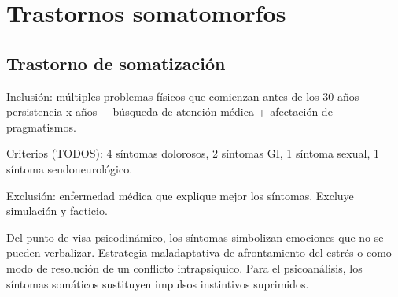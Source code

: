 \chapter{Trastornos somatomorfos}
\section*{Trastorno de somatización}
Inclusión: múltiples problemas físicos que comienzan antes de los 30 años + persistencia x años + búsqueda de atención médica + afectación de pragmatismos.

Criterios (TODOS): 4 síntomas dolorosos, 2 síntomas GI, 1 síntoma sexual, 1 síntoma seudoneurológico.

Exclusión: enfermedad médica que explique mejor los síntomas. Excluye simulación y facticio.

Del punto de visa psicodinámico, los síntomas simbolizan emociones que no se pueden verbalizar. Estrategia maladaptativa de afrontamiento del estrés o como modo de resolución de un conflicto intrapsíquico.
Para el psicoanálisis, los síntomas somáticos sustituyen impulsos instintivos suprimidos.
\printbibliography
